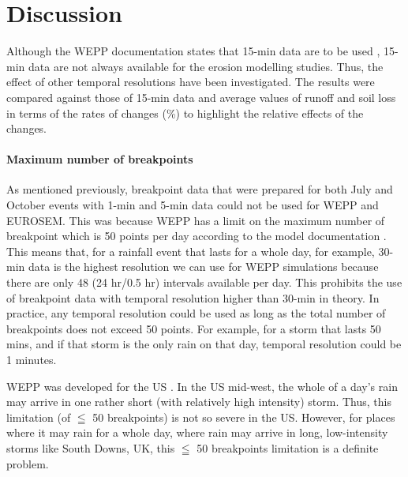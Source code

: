 \section{Discussion}
\label{sec:TemporalScalesDiscussion}

Although the WEPP documentation states that 15-min data are to be used
\citep{flanagan1995-weppusersummary}, 15-min data are not always available for
the erosion modelling studies. Thus, the effect of other temporal resolutions
have been investigated. The results were compared against those of 15-min data
and average values of runoff and soil loss in terms of the rates of changes (\%)
to highlight the relative effects of the changes.

\paragraph{Maximum number of breakpoints} As mentioned previously, breakpoint
data that were prepared for both July and October events with 1-min and 5-min
data could not be used for WEPP and EUROSEM. This was because WEPP has a limit
on the maximum number of breakpoint which is 50 points per day according to the
model documentation \citep[see][page 10]{flanagan1995-weppusersummary}. This
means that, for a rainfall event that lasts for a whole day, for example, 30-min
data is the highest resolution we can use for WEPP simulations because there are
only 48 (24 hr/0.5 hr) intervals available per day. This prohibits the use of
breakpoint data with temporal resolution higher than 30-min in theory. In
practice, any temporal resolution could be used as long as the total number of
breakpoints does not exceed 50 points. For example, for a storm that lasts 50
mins, and if that storm is the only rain on that day, temporal resolution could
be 1 minutes.

WEPP was developed for the US \citep{flanagan2007-1603}. In the US mid-west, the
whole of a day's rain may arrive in one rather short (with relatively high
intensity) storm. Thus, this limitation (of $\leqq$ 50 breakpoints) is not so
severe in the US. However, for places where it may rain for a whole day, where
rain may arrive in long, low-intensity storms like South Downs, UK, this $\leqq$
50 breakpoints limitation is a definite problem.

